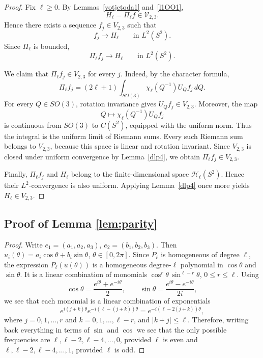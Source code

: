 \documentclass[11pt]{article}
\theoremstyle{definition}
\begin{document}
\begin{proof}
Fix \(\ell\ge0\). By Lemmas~\ref{votjetoda1} and~\ref{l1OO1},
\[
H_\ell=\Pi_\ell f\in\mathcal V_{2,3}.
\]
Hence there exists a sequence \(f_j\in V_{2,3}\) such that
\[
f_j\longrightarrow H_\ell
\qquad\text{in }L^2(S^2).
\]
Since \(\Pi_\ell\) is bounded,
\[
\Pi_\ell f_j\longrightarrow H_\ell
\qquad\text{in }L^2(S^2).
\]

We claim that \(\Pi_\ell f_j\in V_{2,3}\) for every \(j\). Indeed, by the character
formula,
\[
\Pi_\ell f_j
=(2\ell+1)\int_{SO(3)}\chi_\ell(Q^{-1})U_Qf_j\,dQ.
\]
For every \(Q\in SO(3)\), rotation invariance gives \(U_Qf_j\in V_{2,3}\).
Moreover, the map
\[
Q\longmapsto \chi_\ell(Q^{-1})U_Qf_j
\]
is continuous from \(SO(3)\) to \(C(S^2)\), equipped with the uniform norm. Thus the
integral is the uniform limit of Riemann sums. Every such Riemann sum belongs to
\(V_{2,3}\), because this space is linear and rotation invariant. Since \(V_{2,3}\) is
closed under uniform convergence by Lemma~\ref{dlp4}, we obtain
\(\Pi_\ell f_j\in V_{2,3}\).

Finally, \(\Pi_\ell f_j\) and \(H_\ell\) belong to the finite-dimensional space
\(\mathcal H_\ell(S^2)\). Hence their \(L^2\)-convergence is also uniform. Applying
Lemma~\ref{dlp4} once more yields \(H_\ell\in V_{2,3}\).
\end{proof}





\subsection{Proof of Lemma \ref{lem:parity}}


\begin{proof}
	Write
	$
	e_1=(a_1,a_2,a_3)$, $e_2=(b_1,b_2,b_3)$.
	Then
	$u_i(\theta)=a_i\cos\theta+b_i\sin\theta$, $\theta\in [0,2\pi]$.
	Since \(P_\ell\) is homogeneous of degree \(\ell\), the expression \(P_\ell(u(\theta))\)
	is a homogeneous degree-\(\ell\) polynomial in \(\cos\theta\) and \(\sin\theta\). It is a
	linear combination of monomials
	$
	\cos^r\theta\,\sin^{\ell-r}\theta$, $ 0\le r\le \ell$.
	Using
	\[
	\cos\theta=\frac{e^{i\theta}+e^{-i\theta}}2,\qquad
	\sin\theta=\frac{e^{i\theta}-e^{-i\theta}}{2i},
	\]
	we see that each monomial is a linear combination of exponentials 
	$$
	e^{i(j+k)\theta}e^{-i(\ell-(j+k))\theta}=e^{-i(\ell-2(j+k))\theta}, 
	$$
	where $j=0,1,\dots, r$ and $k=0,1,\dots, \ell-r$,
 and
	\(|k+j|\le \ell\). Therefore, writing back everything in terms of $\sin$ and $\cos$ we see that  the only possible frequencies are
	$\ell,\ell-2,\ell-4,\dots,0$, provided $\ell$ is even and $\ell,\ell-2,\ell-4,\dots,1$, provided $\ell$ is odd.
\end{proof}
\end{document}
